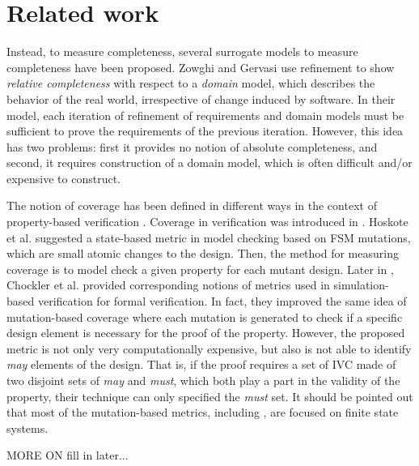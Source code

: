 \section{Related work}
\label{sec:related}

Instead, to measure completeness, several surrogate models to measure completeness have been proposed.  Zowghi and Gervasi use refinement to show {\em relative completeness} with respect to a {\em domain} model, which describes the behavior of the real world, irrespective of change induced by software.  In their model, each iteration of refinement of requirements and domain models must be sufficient to prove the requirements of the previous iteration.  However, this idea has two problems: first it provides no notion of absolute completeness, and second, it requires construction of a domain model, which is often difficult and/or expensive to construct.


The notion of coverage has been defined in different ways in the context of property-based verification \cite{chockler2008causes, chockler2006coverage, chockler_coverage_2003, katz1999have, grosse2007estimating, claessen2007coverage}.
Coverage in verification was introduced in \cite{hoskote1999coverage, katz1999have}. Hoskote et al. \cite{hoskote1999coverage} suggested a state-based metric in model checking based on FSM mutations, which are small atomic changes to the design. Then, the method for measuring coverage is to model check a given property for each mutant design.
Later in \cite{chockler_coverage_2003}, Chockler et al. provided corresponding notions of metrics used in simulation-based verification for formal verification. In fact, they improved the same idea of mutation-based coverage where each mutation is generated to check if a specific
design element is necessary for the proof of the property.
 However, the proposed metric is not only very computationally expensive, but also is not able to identify \emph{may} elements of the design. That is, if the proof requires a set of IVC made of two disjoint sets of \emph{may} and \emph{must}, which both play a part in the validity of the property, their technique can only specified the \emph{must} set. It should be pointed out that most of the mutation-based metrics, including \cite{kupferman_theory_2008, chockler2001practical}, are focused on finite state systems.

 MORE ON \cite{Kupferman:2006:SCF} fill in later...

